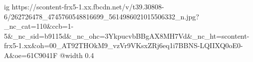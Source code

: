  
 
 
 
 

\ifcmt
  ig https://scontent-frx5-1.xx.fbcdn.net/v/t39.30808-6/262726478_4745760548816699_5614986021015506332_n.jpg?_nc_cat=110&ccb=1-5&_nc_sid=b9115d&_nc_ohc=3YkpucvbBBgAX8MH7Vd&_nc_ht=scontent-frx5-1.xx&oh=00_AT92THOkM9_vzVr9VKsxZRj6eq1i7BBNS-LQIIXQ0oE0-A&oe=61C9041F
  @width 0.4
\fi
